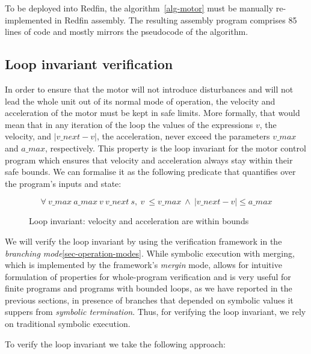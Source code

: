 To be deployed into Redfin, the algorithm~\ref{alg-motor} must be manually
re-implemented in Redfin assembly. The resulting assembly program comprises 85 lines of
code and mostly mirrors the pseudocode of the algorithm.

\subsection{Loop invariant verification}

In order to ensure that the motor will not introduce disturbances
and will not lead the whole unit out of its normal mode of operation, the velocity and
acceleration of the motor must be kept in safe limits. More formally, that would mean
that in any iteration of the loop the values of the expressions $v$, the velocity,
and $\left| v\_next - v \right|$, the acceleration, never exceed the
parameters $v\_max$ and $a\_max$,
respectively. This property is the loop invariant for the motor control program which
ensures that velocity and acceleration always stay within their safe bounds. We can
formalise it as the following predicate that quantifies over the program's inputs and
state:

\begin{figure}[h]
\[
  \forall\ v\_max\ a\_max\ v\ v\_next\ s,
  \ v\ \leq v\_max\ \land\ \left| v\_next - v \right| \leq a\_max
\]
\caption{Loop invariant: velocity and acceleration are within bounds}
\end{figure}

We will verify the loop invariant by using the verification framework in the
\emph{branching mode}\ref{sec-operation-modes}. While symbolic execution with
merging, which is implemented by the framework's \emph{mergin} mode, allows
for intuitive formulation of properties for whole-program verification and
is very useful for finite programs and programs with bounded loops, as we have
reported in the previous sections, in presence of branches that depended on
symbolic values it suppers from \emph{symbolic termination}. Thus, for verifying the
loop invariant, we rely on traditional symbolic execution.

To verify the loop invariant we take the following approach:

